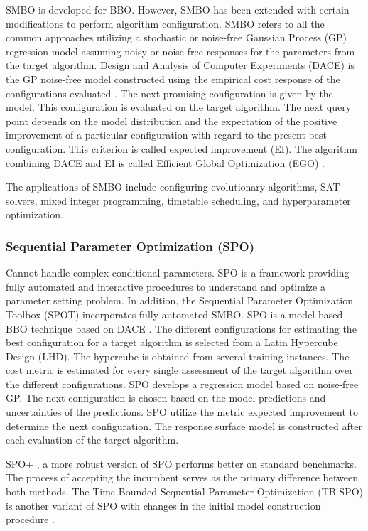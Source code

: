 SMBO is developed for BBO. However, SMBO has been extended with certain modifications to perform algorithm configuration. SMBO refers to all the common approaches utilizing a stochastic or noise-free Gaussian Process (GP) regression model assuming noisy or noise-free responses for the parameters from the target algorithm. Design and Analysis of Computer Experiments (DACE) is the GP noise-free model constructed using the empirical cost response of the configurations evaluated \cite{Hutterphd}. The next promising configuration is given by the model. This configuration is evaluated on the target algorithm. The next query point depends on the model distribution and the expectation of the positive improvement of a particular configuration with regard to the present best configuration. This criterion is called expected improvement (EI). The algorithm combining DACE and EI is called Efficient Global Optimization (EGO) \cite{AAC_Mainreview}.

The applications of SMBO include configuring evolutionary algorithms, SAT solvers, mixed integer programming, timetable scheduling, and hyperparameter optimization.

\subsubsection{Sequential Parameter Optimization (SPO)}
Cannot handle complex conditional parameters.
SPO is a framework providing fully automated and interactive procedures to understand and optimize a parameter setting problem. In addition, the Sequential Parameter Optimization Toolbox (SPOT) incorporates fully automated SMBO. SPO is a model-based BBO technique based on DACE \cite{Bartz_2006}. The different configurations for estimating the best configuration for a target algorithm is selected from a Latin Hypercube Design (LHD). The hypercube is obtained from several training instances. The cost metric is estimated for every single assessment of the target algorithm over the different configurations. SPO develops a regression model based on noise-free GP. The next configuration is chosen based on the model predictions and uncertainties of the predictions. SPO utilize the metric expected improvement to determine the next configuration. The response surface model is constructed after each evaluation of the target algorithm.

SPO+ \cite{SPOplus_2009}, a more robust version of SPO performs better on standard benchmarks. The process of accepting the incumbent serves as the primary difference between both methods. The Time-Bounded Sequential Parameter Optimization (TB-SPO) is another variant of SPO with changes in the initial model construction procedure \cite{TBSPO_2010}.

